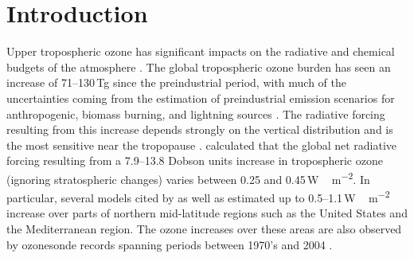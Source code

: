 \chapter{Introduction} \label{ch:introduction}

\ifpdf
    \graphicspath{{Chapter_introduction/figures/PNG/}{Chapter_introduction/figures/PDF/}{Chapter_introduction/figures/}}
\else
    \graphicspath{{Chapter_introduction/figures/EPS/}{Chapter_introduction/figures/}}
\fi


Upper tropospheric ozone has significant impacts on the radiative and chemical budgets of the atmosphere \citep{Kiehl:1999uq}. The global tropospheric ozone burden has seen an increase of 71--130\,\unit{Tg} since the preindustrial period, with much of the uncertainties coming from the estimation of preindustrial emission scenarios for anthropogenic, biomass burning, and lightning sources \citep[][and references therein]{Lamarque:2005gb}. The radiative forcing resulting from this increase depends strongly on the vertical distribution and is the most sensitive near the tropopause \citep{Lacis:1990fk}. \citet{Gauss:2006zr} calculated that the global net radiative forcing resulting from a 7.9--13.8 Dobson units increase in tropospheric ozone (ignoring stratospheric changes) varies between 0.25 and 0.45\,\unit{W\,m^{-2}}. In particular, several models cited by \citet{Gauss:2006zr} as well as \citet{Stevenson:1998fk} estimated up to 0.5--1.1\,\unit{W \,m^{-2}} increase over parts of northern mid-latitude regions such as the United States and the Mediterranean region. The ozone increases over these areas are also observed by ozonesonde records spanning periods between 1970's and 2004 \citep{Oltmans:2006kc}.


